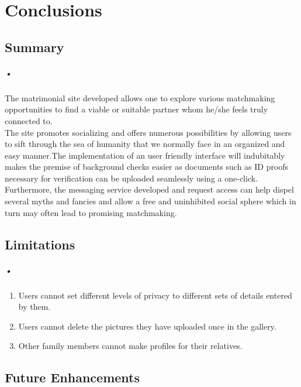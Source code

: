 \documentclass[12pt]{report}
\begin{document}
\chapter{Conclusions}
\section{Summary}
\paragraph*{•}
 
 The matrimonial site developed allows one to explore various matchmaking opportunities to find a viable or suitable partner whom he/she feels truly connected to.\\

The site promotes socializing and offers numerous possibilities by allowing users to sift through the sea of humanity that we normally face in an organized and easy manner.The implementation of an user friendly interface will indubitably makes the premise of background checks easier as documents such as ID proofs necessary for verification can be uploaded seamlessly using a one-click.\\


Furthermore, the messaging service developed and request access can help dispel several myths and fancies and allow a free and uninhibited social sphere which in turn may often lead to promising matchmaking.


\section{Limitations}
\paragraph*{•}
 
\begin{enumerate}
\item Users cannot set different levels of privacy to different sets of details entered by them. 
\item Users cannot delete the pictures they have uploaded once in the gallery. 
\item Other family members cannot make profiles for their relatives.
\end{enumerate}


\section{Future Enhancements}
\end{document}
